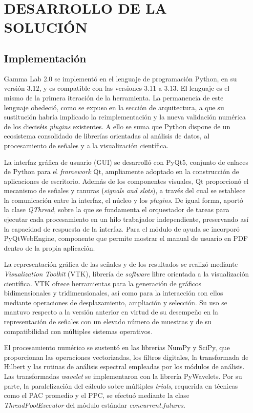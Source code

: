 \documentclass[12pt,letterpaper,oneside]{article}
\newcommand{\capitulo}[1]{\clearpage\section{#1}}
\begin{document}
\capitulo{DESARROLLO DE LA SOLUCIÓN}

\subsection{Implementación}
Gamma Lab 2.0 se implementó en el lenguaje de programación Python, en su versión 3.12, y es compatible con las versiones 3.11 a 3.13. El lenguaje es el mismo de la primera iteración de la herramienta. La permanencia de este lenguaje obedeció, como se expuso en la sección de arquitectura, a que su sustitución habría implicado la reimplementación y la nueva validación numérica de los dieciséis \textit{plugins} existentes. A ello se suma que Python dispone de un ecosistema consolidado de librerías orientadas al análisis de datos, al procesamiento de señales y a la visualización científica. 

La interfaz gráfica de usuario (GUI) se desarrolló con PyQt5, conjunto de enlaces de Python para el \textit{framework} Qt, ampliamente adoptado en la construcción de aplicaciones de escritorio. Además de los componentes visuales, Qt proporcionó el mecanismo de señales y ranuras (\textit{signals and slots}), a través del cual se establece la comunicación entre la interfaz, el núcleo y los \textit{plugins}. De igual forma, aportó la clase \textit{QThread}, sobre la que se fundamenta el orquestador de tareas para ejecutar cada procesamiento en un hilo trabajador independiente, preservando así la capacidad de respuesta de la interfaz. Para el módulo de ayuda se incorporó PyQtWebEngine, componente que permite mostrar el manual de usuario en PDF dentro de la propia aplicación.

La representación gráfica de las señales y de los resultados se realizó mediante \textit{Visualization Toolkit} (VTK), librería de \textit{software} libre orientada a la visualización científica. VTK ofrece herramientas para la generación de gráficos bidimensionales y tridimensionales, así como para la interacción con ellos mediante operaciones de desplazamiento, ampliación y selección. Su uso se mantuvo respecto a la versión anterior en virtud de su desempeño en la representación de señales con un elevado número de muestras y de su compatibilidad con múltiples sistemas operativos.

El procesamiento numérico se sustentó en las librerías NumPy y SciPy, que proporcionan las operaciones vectorizadas, los filtros digitales, la transformada de Hilbert y las rutinas de análisis espectral empleadas por los módulos de análisis. Las transformadas \textit{wavelet} se implementaron con la librería PyWavelets. Por su parte, la paralelización del cálculo sobre múltiples \textit{trials}, requerida en técnicas como el PAC promedio y el PPC, se efectuó mediante la clase \textit{ThreadPoolExecutor} del módulo estándar \textit{concurrent.futures}.
\end{document}
